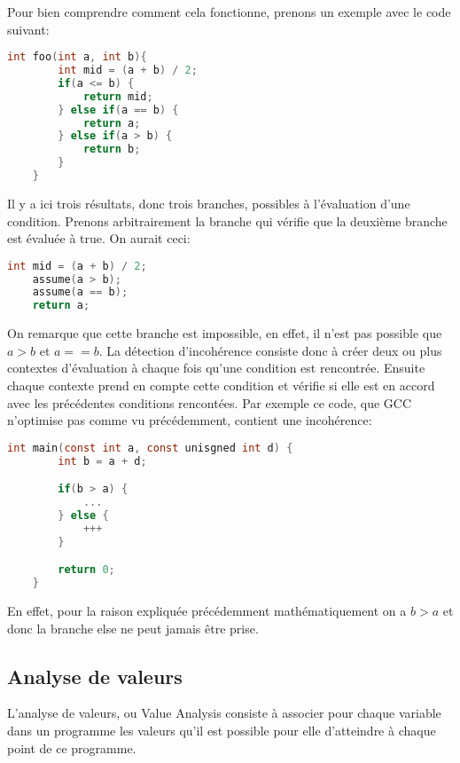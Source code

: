 Pour bien comprendre comment cela fonctionne, prenons un exemple avec le code suivant:
\begin{lstlisting}[language=c, xleftmargin=.2\textwidth, caption={Programme d'exemple pour la détection d'incohérence}, captionpos=b]
    int foo(int a, int b){
        int mid = (a + b) / 2;
        if(a <= b) {
            return mid;
        } else if(a == b) {
            return a;
        } else if(a > b) {
            return b;
        }
    }
\end{lstlisting}
Il y a ici trois résultats, donc trois branches, possibles à l'évaluation d'une condition. Prenons arbitrairement la branche qui vérifie que la deuxième branche est évaluée à true. On aurait ceci:
\begin{lstlisting}[language=c, xleftmargin=.2\textwidth, caption={Deuxième branche évaluée à true du programme}, captionpos=b]
    int mid = (a + b) / 2;
    assume(a > b);
    assume(a == b);
    return a;
\end{lstlisting}
On remarque que cette branche est impossible, en effet, il n'est pas possible que $a > b$ et $a == b$. La détection d'incohérence consiste donc à créer deux ou plus contextes d'évaluation à chaque fois qu'une condition est rencontrée. Ensuite chaque contexte prend en compte cette condition et vérifie si elle est en accord avec les précédentes conditions rencontées. Par exemple ce code, que GCC n'optimise pas comme vu précédemment, contient une incohérence:
\begin{lstlisting}[language=c, xleftmargin=.2\textwidth, caption={Exemple d'incohérence non optimisé par GCC}, captionpos=b]
    int main(const int a, const unisgned int d) {
        int b = a + d;

        if(b > a) {
            ...
        } else {
            +++
        }

        return 0;
    }
\end{lstlisting}
En effet, pour la raison expliquée précédemment mathématiquement on a $b > a$ et donc la branche else ne peut jamais être prise.

\subsection{Analyse de valeurs}
L'analyse de valeurs, ou \og Value Analysis \fg{} consiste à associer pour chaque variable dans un programme les valeurs qu'il est possible pour elle d'atteindre à chaque point de ce programme.

